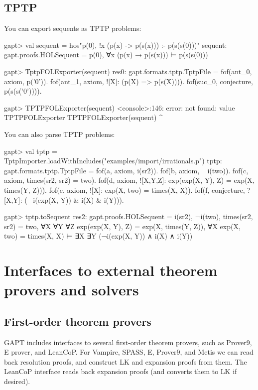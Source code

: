 \documentclass[a4paper,11pt]{book}
\begin{document}
\section{TPTP}
You can export sequents as TPTP problems:
\begin{clilisting}
gapt> val sequent = hos"p(0), !x (p(x) -> p(s(x))) :- p(s(s(0)))"
sequent: gapt.proofs.HOLSequent = p(0), ∀x (p(x) → p(s(x))) ⊢ p(s(s(0)))

gapt> TptpFOLExporter(sequent)
res0: gapt.formats.tptp.TptpFile =
fof(ant_0, axiom, p('0')).
fof(ant_1, axiom, ![X]: (p(X) => p(s(X)))).
fof(suc_0, conjecture, p(s(s('0')))).

gapt> TPTPFOLExporter(sequent)
<console>:146: error: not found: value TPTPFOLExporter
      TPTPFOLExporter(sequent)
      ^

\end{clilisting}

You can also parse TPTP problems:
\begin{clilisting}
gapt> val tptp = TptpImporter.loadWithIncludes("examples/import/irrationals.p")
tptp: gapt.formats.tptp.TptpFile =
fof(a, axiom, i(sr2)).
fof(b, axiom, ~ i(two)).
fof(c, axiom, times(sr2, sr2) = two).
fof(d, axiom, ![X,Y,Z]: exp(exp(X, Y), Z) = exp(X, times(Y, Z))).
fof(e, axiom, ![X]: exp(X, two) = times(X, X)).
fof(f, conjecture, ?[X,Y]: (~ i(exp(X, Y)) & i(X) & i(Y))).

gapt> tptp.toSequent
res2: gapt.proofs.HOLSequent =
i(sr2),
¬i(two),
times(sr2, sr2) = two,
∀X ∀Y ∀Z exp(exp(X, Y), Z) = exp(X, times(Y, Z)),
∀X exp(X, two) = times(X, X)
⊢
∃X ∃Y (¬i(exp(X, Y)) ∧ i(X) ∧ i(Y))

\end{clilisting}

\chapter{Interfaces to external theorem provers and solvers}


\section{First-order theorem provers}\label{sec:fol_provers}

GAPT includes interfaces to several first-order theorem provers, such as
Prover9, E prover, and LeanCoP.  For Vampire, SPASS, E, Prover9, and Metis we can read back
resolution proofs, and construct LK and expansion proofs from them.  The
LeanCoP interface reads back expansion proofs (and converts them to LK if desired).
\end{document}
